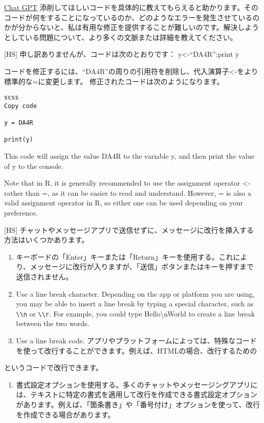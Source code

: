\documentclass[
]{book}
\providecommand{\tightlist}{%
  \setlength{\itemsep}{0pt}\setlength{\parskip}{0pt}}
\theoremstyle{definition}
\theoremstyle{definition}
\theoremstyle{definition}
\theoremstyle{definition}
\theoremstyle{remark}
\begin{document}
\protect\hyperlink{chatgpt}{Chat GPT} 添削してほしいコードを具体的に教えてもらえると助かります。そのコードが何をすることになっているのか、どのようなエラーを発生させているのかが分からないと、私は有用な修正を提供することが難しいのです。解決しようとしている問題について、より多くの文脈または詳細を教えてください。

{[}HS{]} 申し訳ありませんが、コードは次のとおりです： y\textless-``DA4R'':print y

コードを修正するには、``DA4R''の周りの引用符を削除し、代入演算子\textless-をより標準的な=に変更します。 修正されたコードは次のようになります。

\begin{verbatim}
scss
Copy code

y = DA4R

print(y)
\end{verbatim}

This code will assign the value DA4R to the variable y, and then print the value of y to the console.

Note that in R, it is generally recommended to use the assignment operator \textless- rather than =, as it can be easier to read and understand. However, = is also a valid assignment operator in R, so either one can be used depending on your preference.

{[}HS{]} チャットやメッセージアプリで送信せずに、メッセージに改行を挿入する方法はいくつかあります。

\begin{enumerate}
\def\labelenumi{\arabic{enumi}.}
\item
  キーボードの「Enter」キーまたは「Return」キーを使用する。これにより、メッセージに改行が入りますが、「送信」ボタンまたはキーを押すまで送信されません。
\item
  Use a line break character. Depending on the app or platform you are using, you may be able to insert a line break by typing a special character, such as \texttt{\textbackslash{}\textbackslash{}n} or \texttt{\textbackslash{}\textbackslash{}r}. For example, you could type Hello\textbackslash nWorld to create a line break between the two words.
\item
  Use a line break code. アプリやプラットフォームによっては、特殊なコードを使って改行することができます。例えば、HTMLの場合、改行するための
\end{enumerate}

というコードで改行できます。

\begin{enumerate}
\def\labelenumi{\arabic{enumi}.}
\setcounter{enumi}{3}
\tightlist
\item
  書式設定オプションを使用する。多くのチャットやメッセージングアプリには、テキストに特定の書式を適用して改行を作成できる書式設定オプションがあります。例えば、「箇条書き」や「番号付け」オプションを使って、改行を作成できる場合があります。
\end{enumerate}
\end{document}
